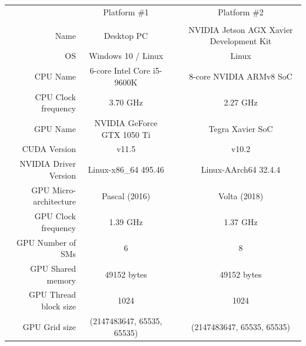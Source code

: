 \documentclass{juliacon}
\begin{document}
\begin{table}[t]
    \begin{tabular}{rclc}
    \multicolumn{1}{l}{}   & Platform \#1               & \multicolumn{1}{c}{} & Platform \#2                              \\ 
    \cline{2-2}\cline{4-4}
    \multicolumn{1}{l}{}   & \multicolumn{1}{l}{}       &                      & \multicolumn{1}{l}{}                      \\
    Name                   & Desktop PC                 &                      & NVIDIA Jetson AGX Xavier Development Kit  \\
    OS                     & Windows 10 / Linux         &                      & Linux                                     \\
    CPU Name               & 6-core Intel Core i5-9600K &                      & 8-core NVIDIA ARMv8 SoC                   \\
    CPU Clock frequency    & 3.70 GHz                   &                      & 2.27 GHz                                  \\
    GPU Name               & NVIDIA GeForce GTX 1050 Ti &                      & Tegra Xavier SoC                          \\
    CUDA Version& v11.5       &                      & v10.2                     \\
    NVIDIA Driver Version & Linux-x86\_64 495.46              &                      & Linux-AArch64 32.4.4                             \\
    GPU Micro-architecture & Pascal (2016)              &                      & Volta (2018)                              \\
    GPU Clock frequency    & 1.39 GHz                   &                      & 1.37 GHz                                  \\
    GPU Number of SMs      & 6                          &                      & 8                                         \\
    GPU Shared memory      & 49152 bytes                &                      & 49152 bytes                               \\
    GPU Thread block size  & 1024                       &                      & 1024                                      \\
    GPU Grid size          & (2147483647, 65535, 65535) &                      & (2147483647, 65535, 65535)               
    \end{tabular}
    \end{table}
\end{document}
